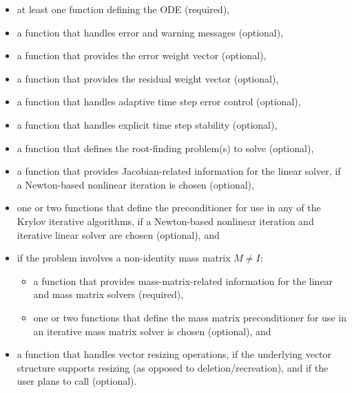 \documentclass[letterpaper,10pt,english]{sphinxmanual}
\begin{document}
\begin{itemize}
\item {} 
at least one function defining the ODE (required),

\item {} 
a function that handles error and warning messages (optional),

\item {} 
a function that provides the error weight vector (optional),

\item {} 
a function that provides the residual weight vector (optional),

\item {} 
a function that handles adaptive time step error control (optional),

\item {} 
a function that handles explicit time step stability (optional),

\item {} 
a function that defines the root-finding problem(s) to solve
(optional),

\item {} 
a function that provides Jacobian-related information for the linear
solver, if a Newton-based nonlinear iteration is chosen (optional),

\item {} 
one or two functions that define the preconditioner for use in any
of the Krylov iterative algorithms, if a Newton-based nonlinear
iteration and iterative linear solver are chosen (optional), and

\item {} 
if the problem involves a non-identity mass matrix $M\ne I$:
\begin{itemize}
\item {} 
a function that provides mass-matrix-related information for the
linear and mass matrix solvers (required),

\item {} 
one or two functions that define the mass matrix preconditioner
for use in an iterative mass matrix solver is chosen (optional), and

\end{itemize}

\item {} 
a function that handles vector resizing operations, if the
underlying vector structure supports resizing (as opposed to
deletion/recreation), and if the user plans to call
{\hyperref[c_interface/User_callable:ARKodeResize]{}} (optional).

\end{itemize}
\end{document}
